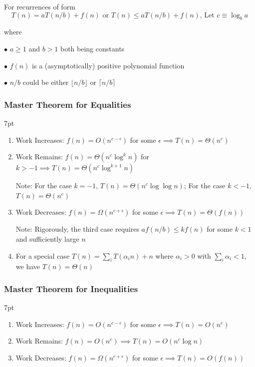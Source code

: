 \documentclass[10pt]{article}
\newenvironment{formal}[2]{%
	\def\FrameCommand{%
		\hspace{1pt}%
		{\color{#1}\vrule width 2pt}%
		{\color{#2}\vrule width 4pt}%
		\colorbox{#2}%
	}%
	\MakeFramed{\advance\hsize-\width\FrameRestore}%
	\noindent\hspace{-4.55pt}%
	\begin{adjustwidth}{}{7pt}%
		\vspace{2pt}\vspace{2pt}%
	}
	{%
		\vspace{2pt}\end{adjustwidth}\endMakeFramed%
}
\begin{document}
For recurrences of form
$$
T(n) = a T(n/b) + f(n) \text{ or } T(n) \leq a T(n/b) + f(n) \text{, Let } c \equiv \log_b a
$$

where

$\bullet$ $a \geq 1$ and $b > 1$ both being constants

$\bullet$ $f(n)$ is a (asymptotically) positive polynomial function

$\bullet$ $n/b$ could be either $\lfloor n/b \rfloor$ or $\lceil n/b \rceil$

\subsubsection{Master Theorem for Equalities}

\begin{formal}{Green}{greenshade}
	
	\begin{enumerate}[label=(\arabic*)]
		\item Work Increases: $f(n) = O(n^{c-\epsilon})$ for some $\epsilon \implies T(n) = \Theta(n^c)$
		
		\item Work Remains: $f(n) = \Theta(n^c \log^k n)$ for $k > -1 \implies T(n) = \Theta(n^c \log^{k+1} n)$
		
		Note: For the case $k = -1$, $T(n) = \Theta(n^c \log \log n)$;\quad
		For the case $k < -1$, $T(n) = \Theta(n^c)$
		
		\item Work Decreases: $f(n) = \Omega(n^{c+\epsilon})$ for some $\epsilon \implies T(n) = \Theta(f(n))$
		
		Note: Rigorously, the third case requires $af(n/b) \leq kf(n)$ for some $k<1$ and sufficiently large $n$
		
		\item For a special case $T(n) = \sum_i T(\alpha_i n) + n$ where $\alpha_i > 0$ with $\sum_i \alpha_i < 1$, we have $T(n) = \Theta(n)$
	\end{enumerate}
	
\end{formal}



\subsubsection{Master Theorem for Inequalities}

\begin{formal}{Green}{greenshade}
	
	\begin{enumerate}[label=(\arabic*)]
		\item Work Increases: $f(n) = O(n^{c-\epsilon})$ for some $\epsilon \implies T(n) = O(n^c)$
		
		\item Work Remains: $f(n) = O(n^c) \implies T(n) = O(n^c \log n)$
		
		\item Work Decreases: $f(n) = \Omega(n^{c+\epsilon})$ for some $\epsilon \implies T(n) = O(f(n))$
	\end{enumerate}
	
\end{formal}
\end{document}
